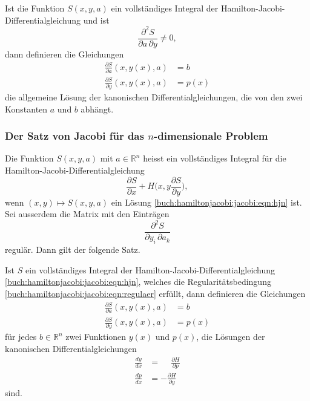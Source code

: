 \begin{satz}[Jacobi]
Ist die Funktion $S(x,y,a)$ ein vollständiges Integral der
Hamilton-Jacobi-Differentialgleichung und ist
\[
\frac{\partial^2 S}{\partial a\,\partial y}\ne 0,
\]
dann definieren die Gleichungen
\begin{align*}
\frac{\partial S}{\partial a}(x,y(x),a) &= b \\
\frac{\partial S}{\partial y}(x,y(x),a) &= p(x)
\end{align*}
die allgemeine Lösung der kanonischen Differentialgleichungen, die von
den zwei Konstanten $a$ und $b$ abhängt.
\end{satz}

%
%
\subsubsection{Der Satz von Jacobi für das $n$-dimensionale Problem}
Die Funktion $S(x,y,a)$ mit $a\in\mathbb{R}^n$ heisst ein
vollständiges Integral für die Hamilton-Jacobi-Differentialgleichung
\begin{equation}
\frac{\partial S}{\partial x}
+
H\biggl(x,y
\frac{\partial S}{\partial y}
\biggr),
\label{buch:hamiltonjacobi:jacobi:eqn:hjn}
\end{equation}
wenn $(x,y)\mapsto S(x,y,a)$ ein Lösung 
\eqref{buch:hamiltonjacobi:jacobi:eqn:hjn} ist.
Sei ausserdem die Matrix mit den Einträgen
\begin{equation}
\frac{\partial^2 S}{\partial y_i\,\partial a_k}
\label{buch:hamiltonjacobi:jacobi:eqn:regulaer}
\end{equation}
regulär.
Dann gilt der folgende Satz.

\begin{satz}[Jacobi]
Ist $S$ ein vollständiges Integral der Hamilton-Jacobi-Differentialgleichung
\eqref{buch:hamiltonjacobi:jacobi:eqn:hjn}, welches die Regularitätsbedingung
\eqref{buch:hamiltonjacobi:jacobi:eqn:regulaer} erfüllt,
dann definieren die Gleichungen
\begin{align}
\frac{\partial S}{\partial a}(x,y(x),a) &= b
\label{buch:hamiltonjacobi:jacobi:eqn:implizit1}
\\
\frac{\partial S}{\partial y}(x,y(x),a) &= p(x)
\label{buch:hamiltonjacobi:jacobi:eqn:implizit2}
\end{align}
für jedes $b\in\mathbb{R}^n$ zwei Funktionen $y(x)$ und $p(x)$, die
Lösungen der kanonischen Differentialgleichungen
\begin{align*}
\frac{dy}{dx} &= \phantom{-}\frac{\partial H}{\partial p}
\\
\frac{dp}{dx} &= -\frac{\partial H}{\partial y}
\end{align*}
sind.
\end{satz}

